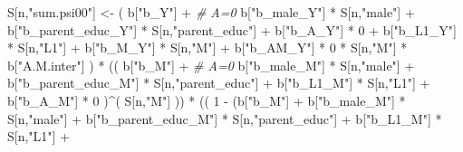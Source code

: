 \documentclass[
]{book}
\newenvironment{Shaded}{\begin{snugshade}}{\end{snugshade}}
\newcommand{\CommentTok}[1]{\textcolor[rgb]{0.56,0.35,0.01}{\textit{#1}}}
\newcommand{\DecValTok}[1]{\textcolor[rgb]{0.00,0.00,0.81}{#1}}
\newcommand{\NormalTok}[1]{#1}
\newcommand{\OtherTok}[1]{\textcolor[rgb]{0.56,0.35,0.01}{#1}}
\newcommand{\SpecialCharTok}[1]{\textcolor[rgb]{0.00,0.00,0.00}{#1}}
\newcommand{\StringTok}[1]{\textcolor[rgb]{0.31,0.60,0.02}{#1}}
\begin{document}
\begin{Shaded}
\begin{Highlighting}[]
\NormalTok{    S[n,}\StringTok{"sum.psi00"}\NormalTok{] }\OtherTok{\textless{}{-}}\NormalTok{  ( b[}\StringTok{"b\_Y"}\NormalTok{] }\SpecialCharTok{+}                                           \CommentTok{\# A=0}
\NormalTok{                             b[}\StringTok{"b\_male\_Y"}\NormalTok{] }\SpecialCharTok{*}\NormalTok{ S[n,}\StringTok{"male"}\NormalTok{] }\SpecialCharTok{+} 
\NormalTok{                             b[}\StringTok{"b\_parent\_educ\_Y"}\NormalTok{] }\SpecialCharTok{*}\NormalTok{ S[n,}\StringTok{"parent\_educ"}\NormalTok{] }\SpecialCharTok{+} 
\NormalTok{                             b[}\StringTok{"b\_A\_Y"}\NormalTok{] }\SpecialCharTok{*} \DecValTok{0} \SpecialCharTok{+} 
\NormalTok{                             b[}\StringTok{"b\_L1\_Y"}\NormalTok{] }\SpecialCharTok{*}\NormalTok{ S[n,}\StringTok{"L1"}\NormalTok{] }\SpecialCharTok{+}
\NormalTok{                             b[}\StringTok{"b\_M\_Y"}\NormalTok{] }\SpecialCharTok{*}\NormalTok{ S[n,}\StringTok{"M"}\NormalTok{] }\SpecialCharTok{+}
\NormalTok{                             b[}\StringTok{"b\_AM\_Y"}\NormalTok{] }\SpecialCharTok{*} \DecValTok{0} \SpecialCharTok{*}\NormalTok{ S[n,}\StringTok{"M"}\NormalTok{] }\SpecialCharTok{*}\NormalTok{ b[}\StringTok{"A.M.inter"}\NormalTok{] ) }\SpecialCharTok{*}
\NormalTok{      (( b[}\StringTok{"b\_M"}\NormalTok{] }\SpecialCharTok{+}                                                             \CommentTok{\# A\textquotesingle{}=0}
\NormalTok{           b[}\StringTok{"b\_male\_M"}\NormalTok{] }\SpecialCharTok{*}\NormalTok{ S[n,}\StringTok{"male"}\NormalTok{] }\SpecialCharTok{+} 
\NormalTok{           b[}\StringTok{"b\_parent\_educ\_M"}\NormalTok{] }\SpecialCharTok{*}\NormalTok{ S[n,}\StringTok{"parent\_educ"}\NormalTok{] }\SpecialCharTok{+} 
\NormalTok{           b[}\StringTok{"b\_L1\_M"}\NormalTok{] }\SpecialCharTok{*}\NormalTok{ S[n,}\StringTok{"L1"}\NormalTok{] }\SpecialCharTok{+}
\NormalTok{           b[}\StringTok{"b\_A\_M"}\NormalTok{] }\SpecialCharTok{*} \DecValTok{0}\NormalTok{ )}\SpecialCharTok{\^{}}\NormalTok{( S[n,}\StringTok{"M"}\NormalTok{] )) }\SpecialCharTok{*}
\NormalTok{      (( }\DecValTok{1} \SpecialCharTok{{-}}\NormalTok{ (b[}\StringTok{"b\_M"}\NormalTok{] }\SpecialCharTok{+} 
\NormalTok{                b[}\StringTok{"b\_male\_M"}\NormalTok{] }\SpecialCharTok{*}\NormalTok{ S[n,}\StringTok{"male"}\NormalTok{] }\SpecialCharTok{+} 
\NormalTok{                b[}\StringTok{"b\_parent\_educ\_M"}\NormalTok{] }\SpecialCharTok{*}\NormalTok{ S[n,}\StringTok{"parent\_educ"}\NormalTok{] }\SpecialCharTok{+} 
\NormalTok{                b[}\StringTok{"b\_L1\_M"}\NormalTok{] }\SpecialCharTok{*}\NormalTok{ S[n,}\StringTok{"L1"}\NormalTok{] }\SpecialCharTok{+}

\end{Highlighting}
\end{Shaded}
\end{document}
